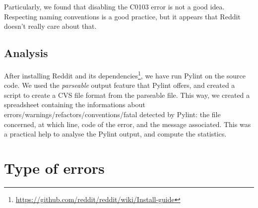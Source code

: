 \documentclass[11pt, a4paper]{article}
\newcommand{\tit}[1]{\textit{#1}}
\newcommand{\pyl}{\textsf{Pylint}}
\begin{document}
\medskip
Particularly, we found that disabling the C0103 error is not a good idea.
Respecting naming conventions is a good practice, but it appears that Reddit doesn't really care about that.


\bigskip
\subsection*{Analysis}
After installing Reddit and its dependencies\footnote{\url{https://github.com/reddit/reddit/wiki/Install-guide}}, we have run \pyl{} on the source code.
We used the \tit{parseable} output feature that \pyl{} offers, and created a script to create a CVS file format from the parseable file.
This way, we created a spreadsheet containing the informations about errors/warnings/refactors/conventions/fatal detected by \pyl{}: the file concerned, at which line, code of the error, and the message associated. This was a practical help to analyse the \pyl{} output, and compute the statistics.


\newpage
\section{Type of errors}
\end{document}
